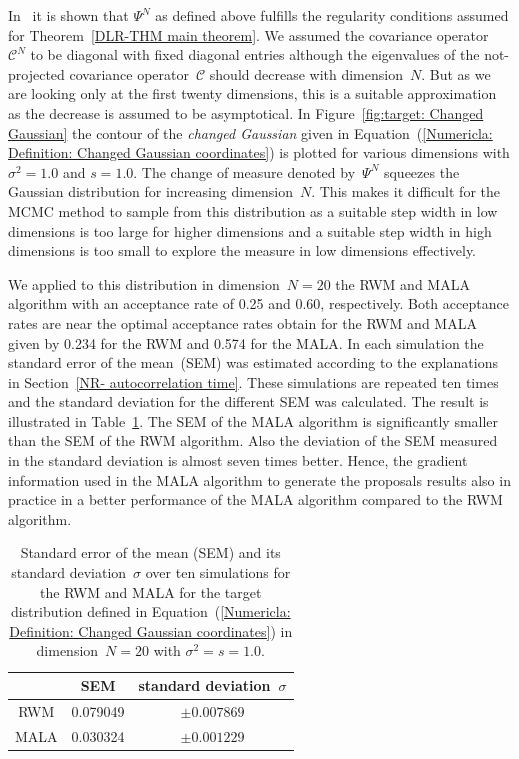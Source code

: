 In~\autocite[Remark 2.3]{Pillai2012} it is shown that $\Psi^N$ as defined above fulfills the regularity conditions assumed for Theorem~\ref{DLR-THM main theorem}. We assumed the covariance operator~$\mathcal{C}^N$ to be diagonal with fixed diagonal entries although the eigenvalues of the not-projected covariance operator~$\mathcal{C}$ should decrease with dimension~$N$. But as we are looking only at the first twenty dimensions, this is a suitable approximation as the decrease is assumed to be asymptotical. In Figure~\ref{fig:target: Changed Gaussian} the contour of the \textit{changed Gaussian} given in Equation~(\ref{Numericla: Definition: Changed Gaussian coordinates}) is plotted for various dimensions with $\sigma^2=1.0$ and $s=1.0$. The change of measure denoted by~$\Psi^N$ squeezes the Gaussian distribution for increasing dimension~$N$. This makes it difficult for the MCMC method to sample from this distribution as a suitable step width in low dimensions is too large for higher dimensions and a suitable step width in high dimensions is too small to explore the measure in low dimensions effectively.


We applied to this distribution in dimension~$N=20$ the RWM and MALA algorithm with an acceptance rate of 0.25 and 0.60, respectively. Both acceptance rates are near the optimal acceptance rates obtain for the RWM and MALA given by 0.234 for the RWM and 0.574 for the MALA. In each simulation the standard error of the mean~(SEM) was estimated according to the explanations in Section~\ref{NR- autocorrelation time}. These simulations are repeated ten times and the standard deviation for the different SEM was calculated. The result is illustrated in Table~\ref{Numerical: Tabular Comparison RWM and MALA}. The SEM of the MALA algorithm is significantly smaller than the SEM of the RWM algorithm. Also the deviation of the SEM measured in the standard deviation is almost seven times better. Hence, the gradient information used in the MALA algorithm to generate the proposals results also in practice in a better performance of the MALA algorithm compared to the RWM algorithm.

\begin{table}%
\centering
 \begin{tabular}{ccc}
     &	SEM	&	standard deviation~$\sigma$ \\ 
  \hline 
 RWM & 0.079049 & $\pm 0.007869$ \\ [1mm]
 MALA & 0.030324 & $\pm 0.001229$ \\
\end{tabular}
 \caption{Standard error of the mean (SEM) and its standard deviation~$\sigma$ over ten simulations for the RWM and MALA for the target distribution defined in Equation~(\ref{Numericla: Definition: Changed Gaussian coordinates}) in dimension~$N=20$ with $\sigma^2=s=1.0$.}
 \label{Numerical: Tabular Comparison RWM and MALA}
\end{table}



